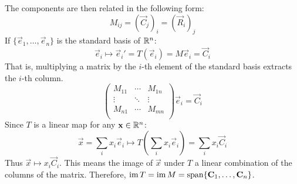 \documentclass[../main.tex]{subfiles}
\begin{document}
The components are then related in the following form:
\[
  M_{i j} = (\vec{C}_j)_i = (\vec{R}_i)_j
\]
If $\{\vec{e}_1, \ldots, \vec{e}_n\}$ is the standard basis of $\mathbb{R}^{n}$:
\[
  \vec{e}_i \mapsto \vec{e}_i' = T(\vec{e}_i) = M\vec{e}_i = \vec{C}_i
\]
That is, multiplying a matrix by the $i$-th element of the standard basis extracts the $i$-th column.
\[
  \begin{pmatrix}
  M_{1 1} & \cdots & M_{1 n} \\
  \vdots & \ddots & \vdots \\
  M_{n 1} & \cdots & M_{m n} \\
  \end{pmatrix}
  \vec{e}_i = \vec{C}_i
\]
Since $T$ is a linear map for any $\boldsymbol{\mathbf{x}} \in \mathbb{R}^{n}$:
\[
  \vec{x} = \sum_{i} x_i \vec{e}_i \mapsto T\left(\sum_{i} x_i \vec{e}_i \right) = \sum_{i} x_i \vec{C}_i
\]
Thus $\vec{x} \mapsto x_i \vec{C}_i$.
This means the image of $\vec{x}$ under $T$ a linear combination of the columns of the matrix.
Therefore, $\operatorname{im} T = \operatorname{im} M = \operatorname{span}\{\boldsymbol{\mathbf{C}}_1, \ldots, \boldsymbol{\mathbf{C}}_n\}$.
\end{document}
